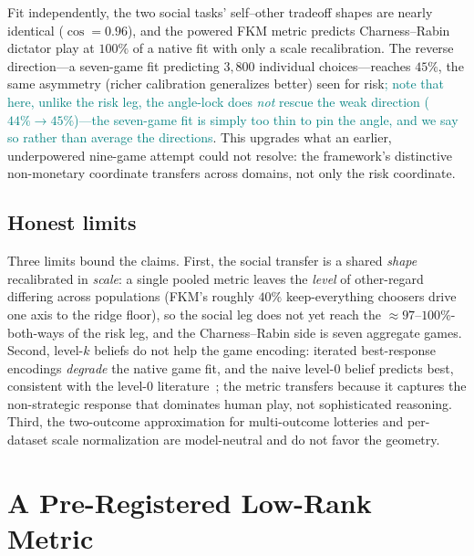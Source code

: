 \documentclass[journal]{IEEEtran}
\newcommand{\rev}[1]{\textcolor{teal}{#1}}
\begin{document}
Fit independently, the two social tasks' self--other tradeoff shapes are nearly identical ($\cos=0.96$), and the powered FKM metric predicts Charness--Rabin dictator play at $100\%$ of a native fit with only a scale recalibration.
The reverse direction---a seven-game fit predicting $3{,}800$ individual choices---reaches $45\%$, the same asymmetry (richer calibration generalizes better) seen for risk\rev{; note that here, unlike the risk leg, the angle-lock does \emph{not} rescue the weak direction ($44\%\to45\%$)---the seven-game fit is simply too thin to pin the angle, and we say so rather than average the directions}.
This upgrades what an earlier, underpowered nine-game attempt could not resolve: the framework's distinctive non-monetary coordinate transfers across domains, not only the risk coordinate.

\subsection{Honest limits}
Three limits bound the claims.
First, the social transfer is a shared \emph{shape} recalibrated in \emph{scale}: a single pooled metric leaves the \emph{level} of other-regard differing across populations (FKM's roughly $40\%$ keep-everything choosers drive one axis to the ridge floor), so the social leg does not yet reach the $\approx97$--$100\%$-both-ways of the risk leg, and the Charness--Rabin side is seven aggregate games.
Second, level-$k$ beliefs do not help the game encoding: iterated best-response encodings \emph{degrade} the native game fit, and the naive level-$0$ belief predicts best, consistent with the level-$0$ literature~\cite{wright2017}; the metric transfers because it captures the non-strategic response that dominates human play, not sophisticated reasoning.
Third, the two-outcome approximation for multi-outcome lotteries and per-dataset scale normalization are model-neutral and do not favor the geometry.

\section{A Pre-Registered Low-Rank Metric}
\label{sec:lowrank}
\end{document}
